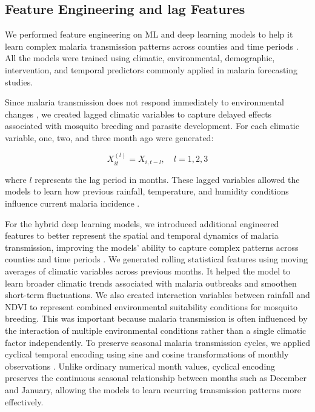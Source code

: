     \subsection{Feature Engineering and lag Features}
    \label{sec:feature_scaling}
    \label{sec:lagged_features}
     We performed feature engineering on ML and deep learning models to help it learn complex malaria transmission patterns across counties and time periods . All the models were trained using climatic, environmental, demographic, intervention, and temporal predictors commonly applied in malaria forecasting studies. 
    
    Since malaria transmission does not respond immediately to environmental changes \cite{Bhatt2015}, we created lagged climatic variables to capture delayed effects associated with mosquito breeding and parasite development. For each climatic variable, one, two, and three month ago were generated:
    
    \[
    X_{it}^{(l)} = X_{i,t-l}, \quad l = 1,2,3
    \]
    
    where \(l\) represents the lag period in months. These lagged variables allowed the models to learn how previous rainfall, temperature, and humidity conditions influence current malaria incidence \cite{Okundalaye2025Climate-based}.
    
    For the hybrid deep learning models, we introduced additional engineered features to better represent the spatial and temporal dynamics of malaria transmission, improving the models’ ability to capture complex patterns across counties and time periods \cite{Srivastava2025}. We generated rolling statistical features  using moving averages of climatic variables across previous months. It helped the model to learn broader climatic trends associated with malaria outbreaks and smoothen short-term fluctuations. We also created interaction variables  between rainfall and NDVI to represent combined environmental suitability conditions for mosquito breeding. This was important because malaria transmission is often influenced by the interaction of multiple environmental conditions rather than a single climatic factor independently. To preserve seasonal malaria transmission cycles, we applied cyclical temporal encoding  using sine and cosine transformations of monthly observations \cite{Goodfellow-et-al-2016}. Unlike ordinary numerical month values, cyclical encoding preserves the continuous seasonal relationship between months such as December and January, allowing the models to learn recurring transmission patterns more effectively.
     
